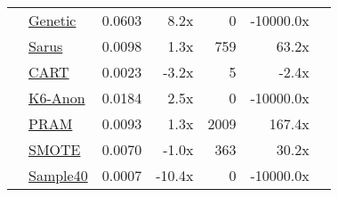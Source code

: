 \begin{table}
\begin{tabular}{llr@{\hskip 6pt}r@{\hskip 10pt}rrl}
        \cellcolor{YellowGreen} & \href{https://htmlpreview.github.io/?https://github.com/yoid2000/sdnist-summary/blob/main/results/genetic_sd_e_10_simple/report.html}{Genetic} & 0.0603 & 8.2x & 0 & -10000.0x \\
        \cellcolor{YellowGreen} & \href{https://htmlpreview.github.io/?https://github.com/yoid2000/sdnist-summary/blob/main/results/sarus_sdg_demographic/report.html}{Sarus} & 0.0098 & 1.3x & 759 & 63.2x \\
        \cellcolor{SkyBlue} & \href{https://htmlpreview.github.io/?https://github.com/yoid2000/sdnist-summary/blob/main/results/cart_cf21/report.html}{CART} & 0.0023 & -3.2x & 5 & -2.4x \\
        \cellcolor{pink} & \href{https://htmlpreview.github.io/?https://github.com/yoid2000/sdnist-summary/blob/main/results/k_anonymity_k_6/report.html}{K6-Anon} & 0.0184 & 2.5x & 0 & -10000.0x \\
        \cellcolor{Tan} & \href{https://htmlpreview.github.io/?https://github.com/yoid2000/sdnist-summary/blob/main/results/pram_default/report.html}{PRAM} & 0.0093 & 1.3x & 2009 & 167.4x \\
        \cellcolor{Sepia} & \href{https://htmlpreview.github.io/?https://github.com/yoid2000/sdnist-summary/blob/main/results/smote_target_marital/report.html}{SMOTE} & 0.0070 & -1.0x & 363 & 30.2x \\
        \cellcolor{Sepia} & \href{https://htmlpreview.github.io/?https://github.com/yoid2000/sdnist-summary/blob/main/results/subsample_40pcnt_all/report.html}{Sample40} & 0.0007 & -10.4x & 0 & -10000.0x \\
        \bottomrule
    \end{tabular}
\end{table}
